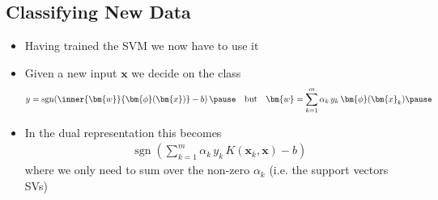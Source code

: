 \begin{slide}
\section[-2]{Classifying New Data}

\begin{PauseHighLight}
  \begin{itemize}
  \item Having trained the SVM we now have to use it\pause
  \item Given a new input $\bm{x}$ we decide on the class
    \begin{align*}
      &y=\mathrm{\mathop{sgn}}\!\left(\inner{\bm{w}}{\bm{\phi}(\bm{x})}-b\right)\pause
        & \text{but}&& \bm{w} = \sum_{k=1}^m
    \alpha_k\,y_k \, \bm{\phi}(\bm{x}_k)\pause
    \end{align*}
  \item In the dual representation this becomes
    \begin{align*}
      \mathrm{\mathop{sgn}}\!\left(\sum_{k=1}^m \alpha_k\, y_k \,
      K(\bm{x}_k,\bm{x})-b\right)
    \end{align*}
    where we only need to sum over the non-zero $\alpha_k$ (i.e. the
    support vectors SVs)\pause
  \end{itemize}
\end{PauseHighLight}

\end{slide}


\Outline %

